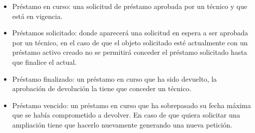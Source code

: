 \begin{itemize}
    \item Préstamo en curso: una solicitud de préstamo aprobada por un técnico y que está en vigencia.
    \item Préstamos solicitado: donde aparecerá una solicitud en espera a ser aprobada por un técnico, en el caso de que el objeto solicitado esté actualmente con un préstamo activo creado no se permitirá conceder el préstamo solicitado hasta que finalice el actual.
    \item Préstamo finalizado: un préstamo en curso que ha sido devuelto, la aprobación de devolución la tiene que conceder un técnico.
    \item Préstamo vencido: un préstamo en curso que ha sobrepasado su fecha máxima que se había comprometido a devolver. En caso de que quiera solicitar una ampliación tiene que hacerlo nuevamente generando una nueva petición.
\end{itemize}
